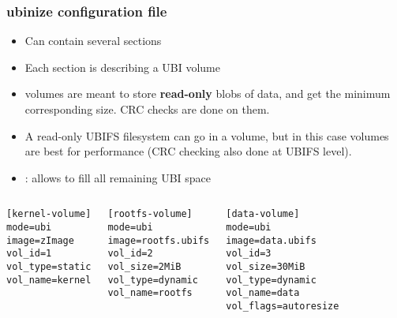 \begin{frame}[fragile]
  \frametitle{ubinize configuration file}
  \begin{itemize}
  \item Can contain several sections
  \item Each section is describing a UBI volume
  \item {} volumes are meant to store {\bf read-only} blobs of data,
	and get the minimum corresponding size. CRC checks are done on
        them.
  \item A read-only UBIFS filesystem can go in a 
	volume, but in this case  volumes are best
        for performance (CRC checking also done at UBIFS level).
  \item {}: allows to fill all remaining UBI space
  \end{itemize}
  \begin{columns}
\small
\begin{verbatim}
[kernel-volume]
mode=ubi
image=zImage
vol_id=1
vol_type=static
vol_name=kernel
\end{verbatim}
\small
\begin{verbatim}
[rootfs-volume]
mode=ubi
image=rootfs.ubifs
vol_id=2
vol_size=2MiB
vol_type=dynamic
vol_name=rootfs
\end{verbatim}
\small
\begin{verbatim}
[data-volume]
mode=ubi
image=data.ubifs
vol_id=3
vol_size=30MiB
vol_type=dynamic
vol_name=data
vol_flags=autoresize
\end{verbatim}
  \end{columns}
\end{frame}

